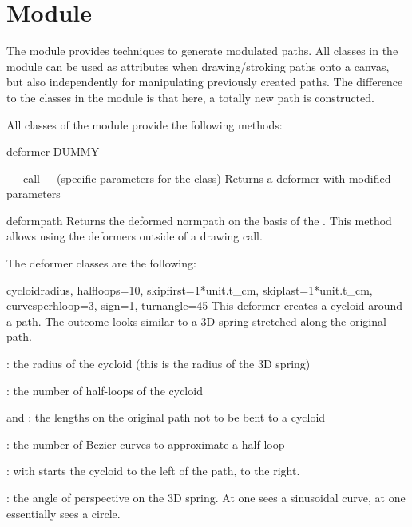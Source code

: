 \section{Module }
\label{deformer}


The  module provides techniques to generate modulated paths.
All classes in the  module can be used as attributes when
drawing/stroking paths onto a canvas, but also independently for manipulating
previously created paths. The difference to the classes in the 
module is that here, a totally new path is constructed.

All classes of the  module provide the following methods:

\begin{classdesc}{deformer}{}
  DUMMY
\end{classdesc}

\begin{methoddesc}{__call__}{(specific parameters for the class)}
Returns a deformer with modified parameters
\end{methoddesc}

\begin{methoddesc}{deform}{path} Returns the deformed normpath on the basis of
the . This method allows using the deformers outside of a
drawing call.
\end{methoddesc}

The deformer classes are the following:

\begin{classdesc}{cycloid}{radius, halfloops=10, skipfirst=1*unit.t_cm,
skiplast=1*unit.t_cm, curvesperhloop=3, sign=1, turnangle=45}
This deformer creates a cycloid around a path. The outcome looks similar to
a 3D spring stretched along the original path.

: the radius of the cycloid (this is the radius of the 3D spring)

: the number of half-loops of the cycloid

 and : the lengths on the original path not to be bent to a cycloid

: the number of Bezier curves to approximate a half-loop

: with  starts the cycloid to the left of the path,  to the right.

: the angle of perspective on the 3D spring. At
 one sees a sinusoidal curve, at  one
essentially sees a circle.
\end{classdesc}

